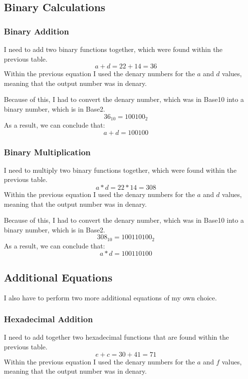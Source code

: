 \documentclass[a4paper,12pt]{article}
\begin{document}
\newpage

\subsection{Binary Calculations}
  \subsubsection{Binary Addition}
    I need to add two binary functions together, which were found within the previous table.
    \[
      a + d = 22 + 14 = 36
    \]
    Within the previous equation I used the denary numbers for the $a$ and $d$ values, meaning that the output number was in denary.

    Because of this, I had to convert the denary number, which was in Base10 into a binary number, which is in Base2.
    \[
      36_{10} = 100100_{2}
    \]
    As a result, we can conclude that:
    \[
      a + d = 100100
    \]

  \subsubsection{Binary Multiplication}
    I need to multiply two binary functions together, which were found within the previous table.
    \[
      a * d = 22 * 14 = 308
    \]
    Within the previous equation I used the denary numbers for the $a$ and $d$ values, meaning that the output number was in denary.

    Because of this, I had to convert the denary number, which was in Base10 into a binary number, which is in Base2.
    \[
      308_{10} = 100110100_{2}
    \]
    As a result, we can conclude that:
    \[
      a * d = 100110100
    \]

\newpage

\subsection{Additional Equations}
  I also have to perform two more additional equations of my own choice.
  \subsubsection{Hexadecimal Addition}
    I need to add together two hexadecimal functions that are found within the previous table.
    \[
      e + c = 30 + 41 = 71
    \]
    Within the previous equation I used the denary numbers for the $a$ and $f$ values, meaning that the output number was in denary.
\end{document}
